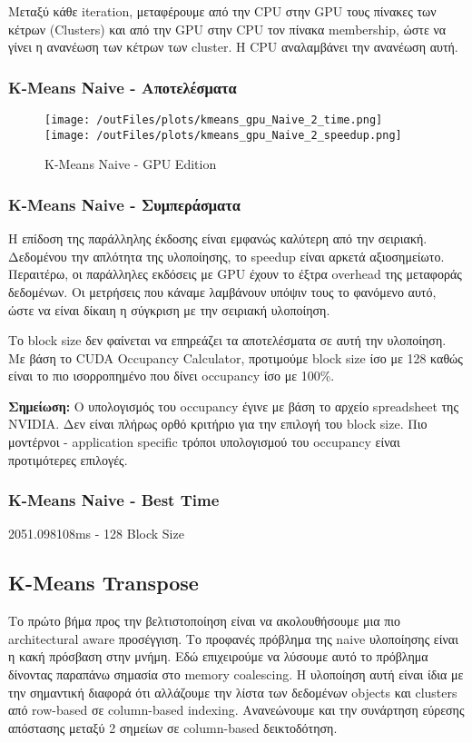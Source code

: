 \documentclass[../final_report.tex]{subfiles}
\begin{document}
Μεταξύ κάθε iteration, μεταφέρουμε από την CPU στην GPU τους πίνακες των κέτρων (Clusters) και από την GPU στην CPU τον πίνακα
membership, ώστε να γίνει η ανανέωση των κέτρων των cluster. Η CPU αναλαμβάνει την ανανέωση αυτή.

\subsubsection*{K-Means Naive - Αποτελέσματα}

\begin{figure}[H]
    \centering
    \texttt{[image: /outFiles/plots/kmeans\_gpu\_Naive\_2\_time.png]}
    \texttt{[image: /outFiles/plots/kmeans\_gpu\_Naive\_2\_speedup.png]}
    \caption{K-Means Naive - GPU Edition}
    \label{fig:K-Means Naive - GPU Edition}
\end{figure}

\subsubsection*{K-Means Naive - Συμπεράσματα}

Η επίδοση της παράλληλης έκδοσης είναι εμφανώς καλύτερη από την σειριακή. Δεδομένου την απλότητα της υλοποίησης, το speedup
είναι αρκετά αξιοσημείωτο. Περαιτέρω, οι παράλληλες εκδόσεις με GPU έχουν το έξτρα overhead της μεταφοράς δεδομένων. Οι μετρήσεις
που κάναμε λαμβάνουν υπόψιν τους το φανόμενο αυτό, ώστε να είναι δίκαιη η σύγκριση με την σειριακή υλοποίηση.

Το block size δεν φαίνεται να επηρεάζει τα αποτελέσματα σε αυτή την υλοποίηση. Με βάση το CUDA Occupancy Calculator, προτιμούμε block size
ίσο με 128 καθώς είναι το πιο ισορροπημένο που δίνει occupancy ίσο με 100\%.

\textbf{Σημείωση:} Ο υπολογισμός του occupancy έγινε με βάση το αρχείο spreadsheet της NVIDIA. Δεν είναι πλήρως ορθό κριτήριο
για την επιλογή του block size. Πιο μοντέρνοι - application specific τρόποι υπολογισμού του occupancy είναι προτιμότερες επιλογές.



\subsubsection*{K-Means Naive - Best Time}

2051.098108ms - 128 Block Size

\subsection{K-Means Transpose}
Το πρώτο βήμα προς την βελτιστοποίηση είναι να ακολουθήσουμε μια πιο architectural aware προσέγγιση. Το προφανές πρόβλημα της naive 
υλοποίησης είναι η κακή πρόσβαση στην μνήμη. Εδώ επιχειρούμε να λύσουμε αυτό το πρόβλημα δίνοντας παραπάνω σημασία στο memory coalescing.
Η υλοποίηση αυτή είναι ίδια με την σημαντική διαφορά ότι αλλάζουμε την λίστα των δεδομένων objects και clusters από row-based
σε column-based indexing. Ανανεώνουμε και την συνάρτηση εύρεσης απόστασης μεταξύ 2 σημείων σε column-based δεικτοδότηση.
\end{document}
